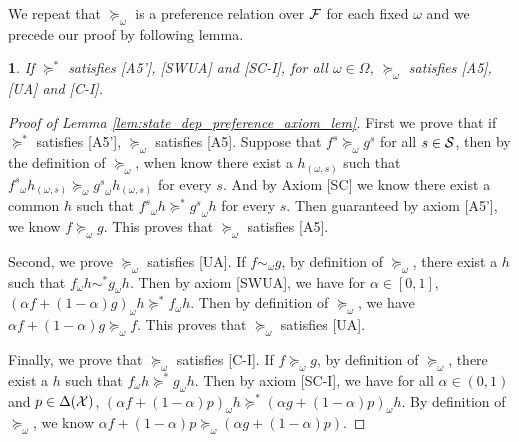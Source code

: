 \documentclass[11pt,oneside]{article}
\theoremstyle{plain}
\theoremstyle{plain}
\theoremstyle{plain}
\theoremstyle{plain}
\theoremstyle{plain}
\theoremstyle{definition}
\theoremstyle{definition}
\theoremstyle{remark}
\theoremstyle{plain}
\newtheorem{lem}[thm]{\protect\lemmaname}
\providecommand{\lemmaname}{Lemma}
\newcommand{\F}{{\cal F}}
\newcommand{\pfo}{\pf_\omega}
\newcommand{\mcs}{{\cal S}}
\newcommand{\mcx}{{\cal X}}
\newcommand{\pf}{\succeq}
\newcommand{\pfs}{\succeq^*}
\newcommand{\convmix}[2]{\alpha #1 + (1-\alpha) #2}
\newcommand{\omix}[2]{#1_\omega #2 }
\begin{document}
We repeat that $\pf_\omega$ is a preference relation over $\F$ for each fixed $\omega$ and we precede our proof by following lemma.
\begin{lem}
    \label{lem:state_dep_preference_axiom_lem}
    If $\pfs$ satisfies [A5'], [SWUA] and [SC-I], for all $\omega \in \Omega$, $\pfo$ satisfies [A5], [UA] and [C-I].
\end{lem}
\begin{proof}[Proof of Lemma \eqref{lem:state_dep_preference_axiom_lem}]
    First we prove that if $\pfs$ satisfies [A5'], $\pfo$ satisfies [A5]. Suppose that $f^s \pfo g^s$ for all $s \in \mcs$, then by the definition of $\pfo$, when know there exist a $h_{(\omega, s)}$ such that
    $\omix{{f^s}}{h_{(\omega, s)}} \pfo \omix{{g^s}}{h_{(\omega, s)}}$ for every $s$. And by Axiom [SC] we know there exist a common $h$ such that $\omix{{f^s}}{h} \pfs \omix{{g^s}}{h}$ for every $s$. Then guaranteed by axiom [A5'], we know
    $f \pfo g$. This proves that $\pfo$ satisfies [A5].

    Second, we prove $\pfo$ satisfies [UA]. If $f \sim_\omega g$, by definition of $\pfo$, there exist a $h$ such that $\omix{f}{h} \sim^* \omix{g}{h}$. Then by axiom [SWUA], we have for
    $\alpha \in [0,1]$, $(\convmix{f}{g})_\omega h \pfs \omix{f}{h}$. Then by definition of $\pfo$, we have $\convmix{f}{g} \pfo f$. This proves that $\pfo$ satisfies [UA].

    Finally, we prove that $\pfo$ satisfies [C-I]. If $f \pfo g$, by definition of $\pfo$, there exist a $h$ such that $\omix{f}{h} \pfs \omix{g}{h}$. Then by axiom [SC-I], we have for all $\alpha \in (0,1)$ and $p \in \Delta(\mcx)$,
    $\omix{(\alpha f + (1-\alpha)p)}{h} \pfs \omix{(\alpha g + (1-\alpha)p)}{h}$. By definition of $\pfo$, we know $\alpha f + (1-\alpha)p \pfo (\alpha g + (1-\alpha)p).$
\end{proof}
\end{document}
